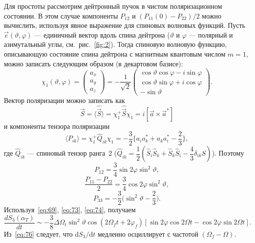 \documentclass[11pt,a4paper]{article}
\newcommand{\hvec}[1]{\hat{\vec{#1}}}
\begin{document}
Для простоты рассмотрим дейтронный пучок в чистом поляризационном состоянии.
В этом случае компоненты $P_{12}$ и $(P_{11}(0)-P_{22})/2$ можно вычислить,
используя явное выражение для спиновых волновых функций. Пусть
$\vec{e}(\vartheta,\varphi)$ --- единичный вектор вдоль спина дейтрона
($\vartheta$ и $\varphi$ --- полярный и азимутальный углы,
см.\ рис.~\ref{fig:2}). Тогда спиновую волновую функцию, описывающую
состояние спина дейтрона с магнитным квантовым числом $m=1$, можно
записать следующим образом (в декартовом базисе):
\begin{equation}
\chi_1(\vartheta,\varphi)
=\begin{pmatrix}a_x\\ a_y\\ a_z\end{pmatrix}
=-\frac{1}{\sqrt{2}}
\begin{pmatrix}
\cos\vartheta\cos\varphi-i\sin\varphi\\
\cos\vartheta\sin\varphi+i\cos\varphi\\
-\sin\vartheta
\end{pmatrix}.
\label{eq:70}
\end{equation}
Вектор поляризации можно записать как
\begin{equation}
\vec{S}=\langle\hvec{S}\rangle=\chi_1^+\hvec{S}\chi_1=i[\vec{a}\times\vec{a}^*]
\label{eq:71}
\end{equation}
и компоненты тензора поляризации
\begin{equation}
\langle P_{ik}\rangle
=\chi_1^+\hat{Q}_{ik}\chi_1
=-\frac32\Biggl\{a_i a_k^*+a_k a_i^*-\frac23\Biggr\},
\label{eq:72}
\end{equation}
где $\hat{Q}_{ik}$ --- спиновый тензор ранга~2
($\hat{Q}_{ik}=\dfrac12(\hat{S}_i\hat{S}_k+\hat{S}_k\hat{S}_i-\dfrac43\delta_{ik}S)$).
Поэтому
\begin{equation}
P_{12}=\frac34\sin 2\varphi\sin^2\vartheta,
\label{eq:73}
\end{equation}
\begin{equation}
\frac{P_{11}-P_{22}}{2}=\frac34\cos 2\varphi\sin^2\vartheta,
\label{eq:74}
\end{equation}
\begin{equation}
P_{33}=-\frac32\Biggl(\sin^2\vartheta-\frac23\Biggr).
\label{eq:75}
\end{equation}
Используя~\eqref{eq:69}, \eqref{eq:73}, \eqref{eq:74}, получаем
\begin{equation}
\frac{dS_3(\alpha_T)}{dt}
\sim -\frac38\Delta\Omega_t\sin^2\vartheta\cos(2\Omega_f t+2\varphi_f)
[\sin 2\varphi\cos 2\Omega t-\cos 2\varphi\sin 2\Omega t].
\label{eq:76}
\end{equation}
Из~\eqref{eq:76} следует, что $\mathrm{d}S_3/\mathrm{d}t$ медленно
осциллирует с частотой $(\Omega_f-\Omega)$.
\end{document}
